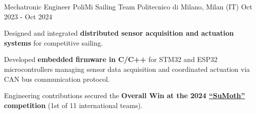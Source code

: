 
\cventry
{Mechatronic Engineer}
{PoliMi Sailing Team}
{Politecnico di Milano, Milan (IT)}
{Oct 2023 - Oct 2024}
{
    \begin{cvitems}
        \item {Designed and integrated \textbf{distributed sensor acquisition and actuation systems} for competitive sailing.}
        \item {Developed \textbf{embedded firmware in C/C++} for STM32 and ESP32 microcontrollers managing sensor data acquisition and coordinated actuation via CAN bus communication protocol.}
        \item {Engineering contributions secured the \textbf{Overall Win at the 2024 \href{https://sumoth.org/}{``SuMoth''} competition} (1st of 11 international teams).}
    \end{cvitems}
}